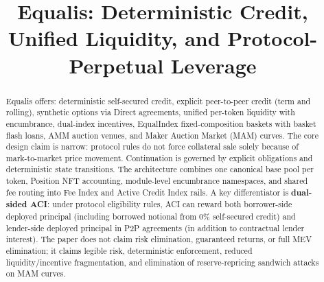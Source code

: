 \documentclass[version=preprint]{iacrcc}
\title[running = {Equalis Committee Edition},
       subtitle = {Condensed Draft}]
      {Equalis: Deterministic Credit, Unified Liquidity, and Protocol-Perpetual Leverage}
\begin{document}
\maketitle

\begin{abstract}
 Equalis offers: deterministic self-secured credit, explicit peer-to-peer credit (term and rolling), synthetic options via Direct agreements, unified per-token liquidity with encumbrance, dual-index incentives, EqualIndex fixed-composition baskets with basket flash loans, AMM auction venues, and Maker Auction Market (MAM) curves. The core design claim is narrow: protocol rules do not force collateral sale solely because of mark-to-market price movement. Continuation is governed by explicit obligations and deterministic state transitions. The architecture combines one canonical base pool per token, Position NFT accounting, module-level encumbrance namespaces, and shared fee routing into Fee Index and Active Credit Index rails. A key differentiator is \textbf{dual-sided ACI}: under protocol eligibility rules, ACI can reward both borrower-side deployed principal (including borrowed notional from 0\% self-secured credit) and lender-side deployed principal in P2P agreements (in addition to contractual lender interest). The paper does not claim risk elimination, guaranteed returns, or full MEV elimination; it claims legible risk, deterministic enforcement, reduced liquidity/incentive fragmentation, and elimination of reserve-repricing sandwich attacks on MAM curves.
\end{abstract}
\end{document}
